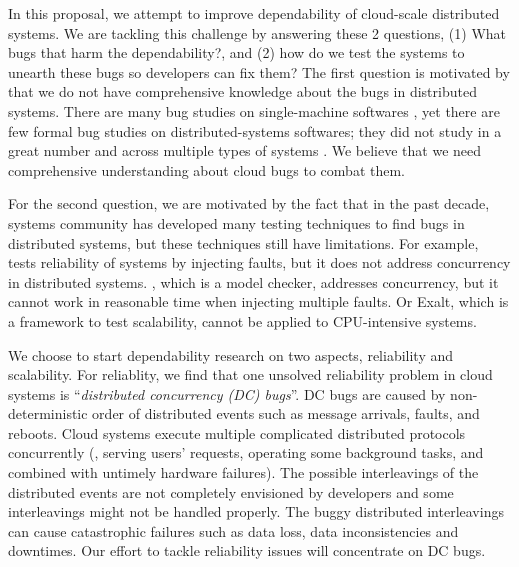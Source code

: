 
In this proposal, we attempt to improve dependability of cloud-scale distributed
systems. We are tackling this challenge by answering these 2 questions, (1) What
bugs that harm the dependability?, and (2) how do we test the systems to unearth
these bugs so developers can fix them? 
%
The first question is motivated by that we do not have comprehensive knowledge
about the bugs in distributed systems. There are many bug studies on
single-machine softwares \cite{Jin+12-PerformanceBugs,
Lu+08-ConcurrencyBugStudy, Palix+11-FaultsInLinux,
Sahoo+10-StudyBugsServerSoftware}, yet there are few formal bug studies on
distributed-systems softwares; they did not study in a great number and across
multiple types of systems \cite{Li+13-ScopeBugStudy, Xiao+14-NonDetMR}. We
believe that we need comprehensive understanding about cloud bugs to combat
them.

For the second question, we are motivated by the fact that in the past decade,
systems community has developed many testing techniques
\cite{Gunawi+11-FateDestini, Guo+11-Demeter, Wang+14-Exalt, Yang+09-Modist} to
find bugs in distributed systems, but these techniques still have limitations.
For example, \fate\ \cite{Gunawi+11-FateDestini} tests reliability of systems by
injecting faults, but it does not address concurrency in distributed systems.
\modist, which is a model checker, addresses concurrency, but it cannot work in
reasonable time when injecting multiple faults. Or Exalt, which is a framework
to test scalability, cannot be applied to CPU-intensive systems. 

We choose to start dependability research on two aspects, reliability and
scalability.
%
For reliablity, we find that one unsolved reliability problem in cloud systems
is ``{\em distributed concurrency (DC) bugs}''. DC bugs are caused  by
non-deterministic order of distributed events such as message arrivals, faults,
and reboots. Cloud systems execute multiple complicated distributed protocols
concurrently (\eg, serving users' requests, operating some background tasks, and
combined with untimely hardware failures). The possible interleavings of the
distributed events are not completely envisioned by developers and some
interleavings might not be handled properly. The buggy distributed interleavings
can cause catastrophic failures such as data loss, data inconsistencies and
downtimes. Our effort to tackle reliability issues will concentrate on DC
bugs.

